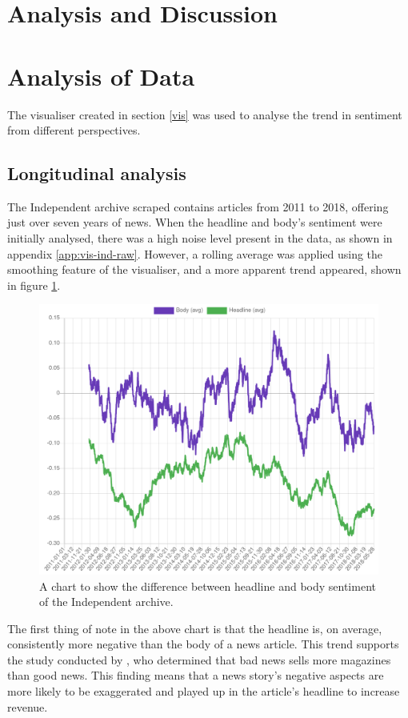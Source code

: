 \section{Analysis and Discussion}

\section{Analysis of Data}
The visualiser created in section \ref{vis} was used to analyse the trend in sentiment from different perspectives.

\subsection{Longitudinal analysis}\label{ana:long}
The Independent archive scraped contains articles from 2011 to 2018, offering just over seven years of news. When the headline and body's sentiment were initially analysed, there was a high noise level present in the data, as shown in appendix \ref{app:vis-ind-raw}. However, a rolling average was applied using the smoothing feature of the visualiser, and a more apparent trend appeared, shown in figure \ref{fig:smooth-ind}.

\begin{figure}[ht!]
  \includegraphics[width=\linewidth]{../visualisation/ind-smooth.png}
  \caption{A chart to show the difference between headline and body sentiment of the Independent archive.}
  \label{fig:smooth-ind}
\end{figure}

The first thing of note in the above chart is that the headline is, on average, consistently more negative than the body of a news article. This trend supports the study conducted by , who determined that bad news sells more magazines than good news. This finding means that a news story's negative aspects are more likely to be exaggerated and played up in the article's headline to increase revenue.

